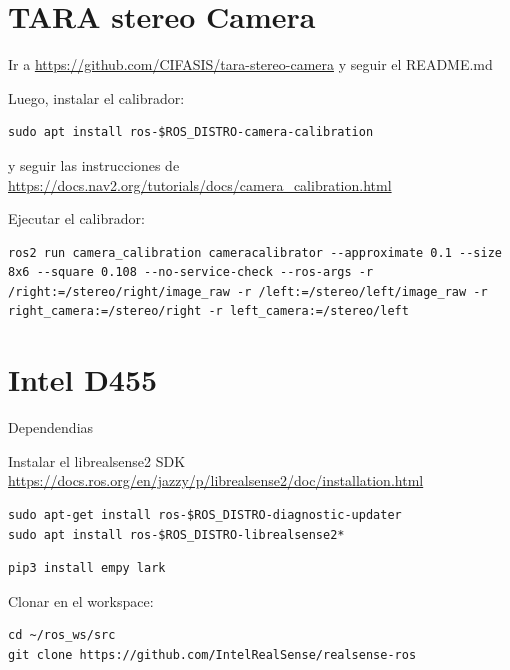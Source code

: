 \documentclass[apunte]{lcc}
\begin{document}
\maketitle

\section{TARA stereo Camera}

Ir a \url{https://github.com/CIFASIS/tara-stereo-camera} y seguir el README.md

Luego, instalar el calibrador:

\begin{lstlisting}[style=bash]
sudo apt install ros-$ROS_DISTRO-camera-calibration
\end{lstlisting}

y seguir las instrucciones de \url{https://docs.nav2.org/tutorials/docs/camera_calibration.html}

Ejecutar el calibrador:

\begin{lstlisting}[style=bash]
ros2 run camera_calibration cameracalibrator --approximate 0.1 --size 8x6 --square 0.108 --no-service-check --ros-args -r /right:=/stereo/right/image_raw -r /left:=/stereo/left/image_raw -r right_camera:=/stereo/right -r left_camera:=/stereo/left
\end{lstlisting}


\section{Intel D455}

Dependendias

Instalar el librealsense2 SDK \url{https://docs.ros.org/en/jazzy/p/librealsense2/doc/installation.html}

\begin{lstlisting}[style=bash]
sudo apt-get install ros-$ROS_DISTRO-diagnostic-updater
sudo apt install ros-$ROS_DISTRO-librealsense2*
\end{lstlisting}

\begin{lstlisting}[style=bash]
pip3 install empy lark
\end{lstlisting}

Clonar en el workspace:
\begin{lstlisting}[style=bash]
cd ~/ros_ws/src
git clone https://github.com/IntelRealSense/realsense-ros
\end{lstlisting}
\end{document}
